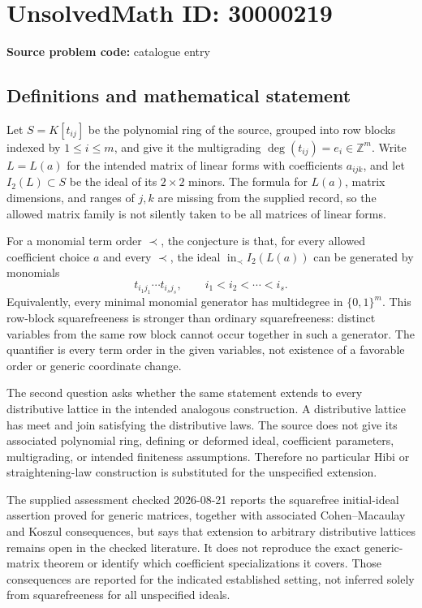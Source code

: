 \documentclass[11pt]{article}
\newcommand{\Z}{\mathbb{Z}}
\begin{document}
\section*{UnsolvedMath ID: 30000219}
\textbf{Source problem code:} catalogue entry
\subsection{Definitions and mathematical statement}
Let \(S=K[t_{ij}]\) be the polynomial ring of the source, grouped into row blocks indexed by \(1\leq i\leq m\), and give it the multigrading \(\deg(t_{ij})=e_i\in\Z^m\). Write \(L=L(a)\) for the intended matrix of linear forms with coefficients \(a_{ijk}\), and let \(I_2(L)\subset S\) be the ideal of its \(2\times2\) minors. The formula for \(L(a)\), matrix dimensions, and ranges of \(j,k\) are missing from the supplied record, so the allowed matrix family is not silently taken to be all matrices of linear forms.

For a monomial term order \(\prec\), the conjecture is that, for every allowed coefficient choice \(a\) and every \(\prec\), the ideal \(\operatorname{in}_{\prec}I_2(L(a))\) can be generated by monomials
\[
t_{i_1j_1}\cdots t_{i_sj_s},\qquad i_1<i_2<\cdots<i_s.
\]
Equivalently, every minimal monomial generator has multidegree in \(\{0,1\}^m\). This row-block squarefreeness is stronger than ordinary squarefreeness: distinct variables from the same row block cannot occur together in such a generator. The quantifier is every term order in the given variables, not existence of a favorable order or generic coordinate change.

The second question asks whether the same statement extends to every distributive lattice in the intended analogous construction. A distributive lattice has meet and join satisfying the distributive laws. The source does not give its associated polynomial ring, defining or deformed ideal, coefficient parameters, multigrading, or intended finiteness assumptions. Therefore no particular Hibi or straightening-law construction is substituted for the unspecified extension.

The supplied assessment checked 2026-08-21 reports the squarefree initial-ideal assertion proved for generic matrices, together with associated Cohen--Macaulay and Koszul consequences, but says that extension to arbitrary distributive lattices remains open in the checked literature. It does not reproduce the exact generic-matrix theorem or identify which coefficient specializations it covers. Those consequences are reported for the indicated established setting, not inferred solely from squarefreeness for all unspecified ideals.
\end{document}
